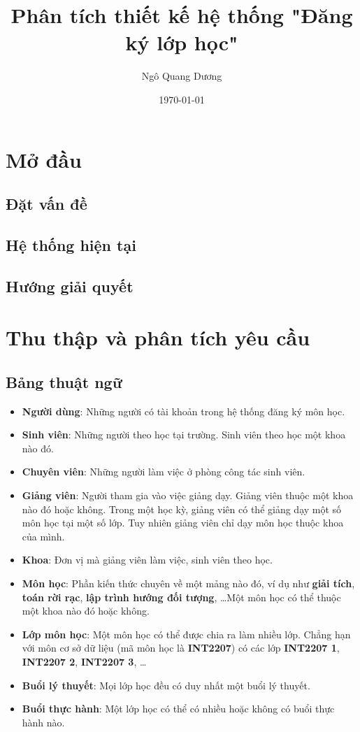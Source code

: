 \documentclass[12pt]{book}
\title{\textbf{Phân tích thiết kế hệ thống "Đăng ký lớp học"}}
\author{
  Ngô Quang Dương
}
\date{\today}
\begin{document}
\maketitle

\tableofcontents

\chapter{Mở đầu}

  \section{Đặt vấn đề}

  \section{Hệ thống hiện tại}

  \section{Hướng giải quyết}

\chapter{Thu thập và phân tích yêu cầu}
  
  \section{Bảng thuật ngữ}
    \begin{itemize}
      \item \textbf{Người dùng}: Những người có tài khoản trong hệ thống đăng ký môn học.
      \item \textbf{Sinh viên}: Những người theo học tại trường. Sinh viên theo học một khoa nào đó.
      \item \textbf{Chuyên viên}: Những người làm việc ở phòng công tác sinh viên.
      \item \textbf{Giảng viên}: Người tham gia vào việc giảng dạy. Giảng viên thuộc một khoa nào đó hoặc không. Trong một học kỳ, giảng viên có thể giảng dạy một số môn học tại một số lớp. Tuy nhiên giảng viên chỉ dạy môn học thuộc khoa của mình.
      \item \textbf{Khoa}: Đơn vị mà giảng viên làm việc, sinh viên theo học.
      \item \textbf{Môn học}: Phần kiến thức chuyên về một mảng nào đó, ví dụ như \textbf{giải tích}, \textbf{toán rời rạc}, \textbf{lập trình hướng đối tượng}, \ldots Một môn học có thể thuộc một khoa nào đó hoặc không.
      \item \textbf{Lớp môn học}: Một môn học có thể được chia ra làm nhiều lớp. Chẳng hạn với môn cơ sở dữ liệu (mã môn học là \textbf{INT2207}) có các lớp \textbf{INT2207 1}, \textbf{INT2207 2}, \textbf{INT2207 3}, \ldots
      \item \textbf{Buổi lý thuyết}: Mọi lớp học đều có duy nhất một buổi lý thuyết.
      \item \textbf{Buổi thực hành}: Một lớp học có thể có nhiều hoặc không có buổi thực hành nào.
    \end{itemize}
  
\end{document}
